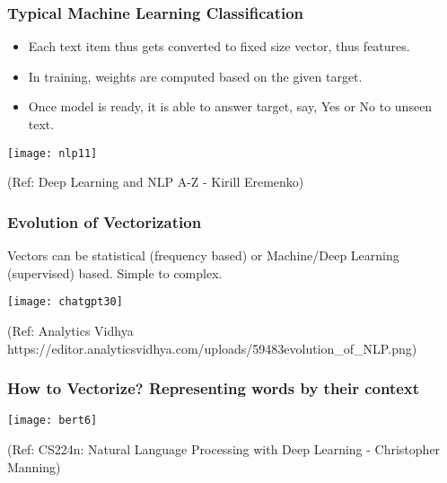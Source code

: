 \begin{frame}[fragile]\frametitle{Typical Machine Learning Classification}
	\begin{itemize}
		\item Each text item thus gets converted to fixed size vector, thus features.
		\item In training, weights are computed based on the given target.
		\item Once model is ready, it is able to answer target, say, Yes or No to unseen text.
			\end{itemize}
\begin{center}
\texttt{[image: nlp11]}

\tiny{(Ref: Deep Learning and NLP A-Z - Kirill Eremenko)}
\end{center}

\end{frame}

\begin{frame}[fragile]\frametitle{Evolution of Vectorization}

Vectors can be statistical (frequency based) or Machine/Deep Learning (supervised) based. Simple to complex.

\begin{center}
\texttt{[image: chatgpt30]}
\end{center}				
{\tiny (Ref: Analytics Vidhya https://editor.analyticsvidhya.com/uploads/59483evolution\_of\_NLP.png)}

\end{frame}


\begin{frame}[fragile]\frametitle{How to Vectorize? Representing words by their context}



\begin{center}
\texttt{[image: bert6]}
\end{center}		  


{\tiny (Ref: CS224n: Natural Language Processing with Deep Learning - Christopher Manning)}

\end{frame}




